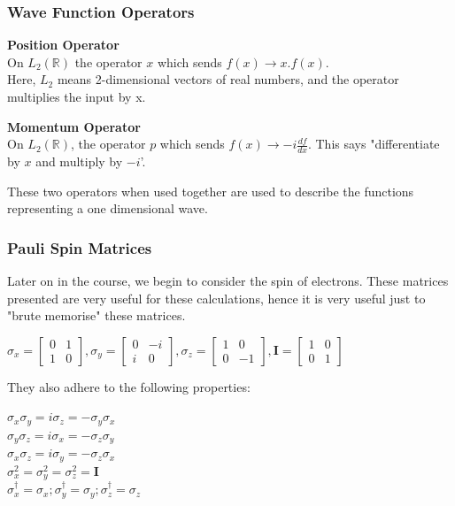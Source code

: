 \documentclass[12pt]{article}
\begin{document}
\subsubsection{Wave Function Operators}

\textbf{Position Operator}\\
On $L_2(\mathbb{R})$ the operator $x$ which sends $f(x) \rightarrow x.f(x)$.\\
Here, $L_2$ means 2-dimensional vectors of real numbers, and the operator multiplies the input by x.

\textbf{Momentum Operator}\\
On $L_2(\mathbb{R})$, the operator $p$ which sends $f(x) \rightarrow -i\frac{df}{dx}$. This says "differentiate by $x$ and multiply by $-i$'.

These two operators when used together are used to describe the functions representing a one dimensional wave.

\subsubsection{Pauli Spin Matrices}
Later on in the course, we begin to consider the spin of electrons. These matrices presented are very useful for these calculations, hence it is very useful just to "brute memorise" these matrices.

\begin{center}
	$\sigma_x = \begin{bmatrix} 0 & 1 \\ 1 & 0 \end{bmatrix}, \sigma_y = \begin{bmatrix} 0 & -i \\ i & 0 \end{bmatrix}, \sigma_z = \begin{bmatrix} 1 & 0 \\ 0 & -1 \end{bmatrix}, \textbf{I} = \begin{bmatrix} 1 & 0 \\ 0 & 1 \end{bmatrix}$
\end{center}

They also adhere to the following properties:

\begin{center}
	$\sigma_x\sigma_y = i\sigma_z = -\sigma_y\sigma_x$\\
$\sigma_y\sigma_z = i\sigma_x = -\sigma_z\sigma_y$\\
$\sigma_x\sigma_z = i\sigma_y = -\sigma_z\sigma_x$\\
$\sigma_x^2 = \sigma_y^2 = \sigma_z^2 = \textbf{I}$\\
$\sigma_x^\dag = \sigma_x; \sigma_y^\dag = \sigma_y; \sigma_z^\dag = \sigma_z$
\end{center}
\end{document}
